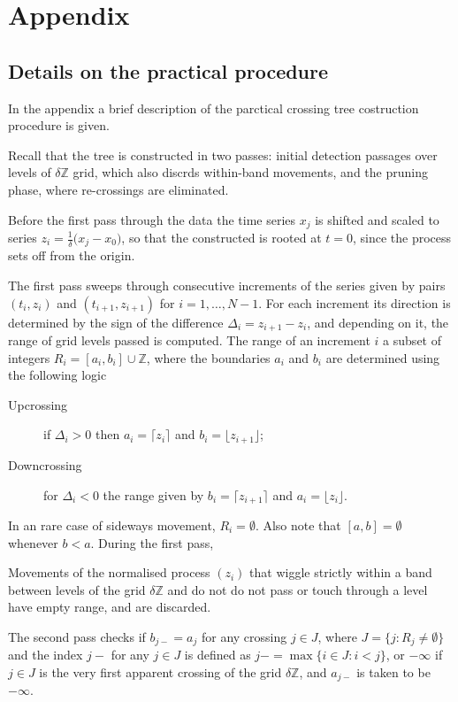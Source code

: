 \chapter*{Appendix} %
\label{cha:appendix}

\section*{Details on the practical procedure} %
\label{sec:details_on_the_practical_procedure}

In the appendix a brief description of the parctical crossing tree costruction
procedure is given.

Recall that the tree is constructed in two passes: initial detection passages over
levels of $\delta \mathbb{Z}$ grid, which also discrds within-band movements, and
the pruning phase, where re-crossings are eliminated.

Before the first pass through the data the time series $x_j$ is shifted and scaled to
series $z_i = \frac{1}{ \delta }\bigl(x_j - x_0\bigr)$, so that the constructed 
is rooted at $t=0$, since the process sets off from the origin.

The first pass sweeps through consecutive increments of the series given by pairs
$(t_i, z_i)$ and $(t_{i+1}, z_{i+1})$ for $i=1, \ldots, N-1$. For each increment
its direction is determined by the sign of the difference $\Delta_i=z_{i+1}-z_i$,
and depending on it, the range of grid levels passed is computed. The range of an
increment $i$ a subset of integers $R_i = [a_i,b_i]\cup\mathbb{Z}$, where the
boundaries $a_i$ and $b_i$ are determined using the following logic
\begin{description}
    \item[Upcrossing] if $\Delta_i > 0$ then $a_i = \lceil z_i \rceil$
    and $b_i = \lfloor z_{i+1}\rfloor$;
    \item[Downcrossing] for $\Delta_i < 0$ the range given by $b_i = \lceil z_{i+1} \rceil$
    and $a_i = \lfloor z_i\rfloor$.
\end{description}
In an rare case of sideways movement, $R_i = \emptyset$. Also note that $[a,b] = \emptyset$
whenever $b<a$. During the first pass,

Movements of the normalised process $(z_i)$ that wiggle strictly within a band
between levels of the grid $\delta \mathbb{Z}$ and do not do not pass or touch
through a level have empty range, and are discarded.

The second pass checks if $b_{j-} = a_j$ for any crossing $j\in J$, where
$J = \{j : R_j\neq \emptyset\}$ and the index $j-$ for any $j\in J$ is defined as
$j- = \max\{i\in J : i < j\}$, or $-\infty$ if $j\in J$ is the very first apparent
crossing of the grid $\delta \mathbb{Z}$, and $a_{j-}$ is taken to be $-\infty$.

